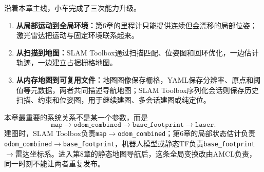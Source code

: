 \documentclass[UTF8,zihao=-4]{ctexart}
\DeclareRobustCommand{\code}[1]{\texttt{#1}}
\begin{document}
沿着本章主线，小车完成了三次能力升级。

\begin{enumerate}
  \item \textbf{从局部运动到全局环境：}第6章的里程计只能提供连续但会漂移的局部位姿；激光雷达把运动与固定环境联系起来。
  \item \textbf{从扫描到地图：}SLAM Toolbox通过扫描匹配、位姿图和回环优化，一边估计轨迹，一边建立占据栅格地图。
  \item \textbf{从内存地图到可复用文件：}地图图像保存栅格，YAML保存分辨率、原点和阈值等元数据，两者共同描述导航地图；SLAM Toolbox序列化会话则保存历史扫描、约束和位姿图，用于继续建图、多会话建图或纯定位。
\end{enumerate}

本章最重要的系统关系不是某一个参数，而是
\begin{equation}
\code{map}\rightarrow\code{odom\_combined}\rightarrow\code{base\_footprint}\rightarrow\code{laser}.
\end{equation}
建图时，SLAM Toolbox负责\code{map}$\rightarrow$\code{odom\_combined}；第6章的局部状态估计负责\code{odom\_combined}$\rightarrow$\code{base\_footprint}，机器人模型或静态TF负责\code{base\_footprint}$\rightarrow$雷达坐标系。进入第8章的静态地图导航后，这条全局变换改由AMCL负责，同一时刻不能让两者重复发布。

\begin{center}
\end{center}
\end{document}
